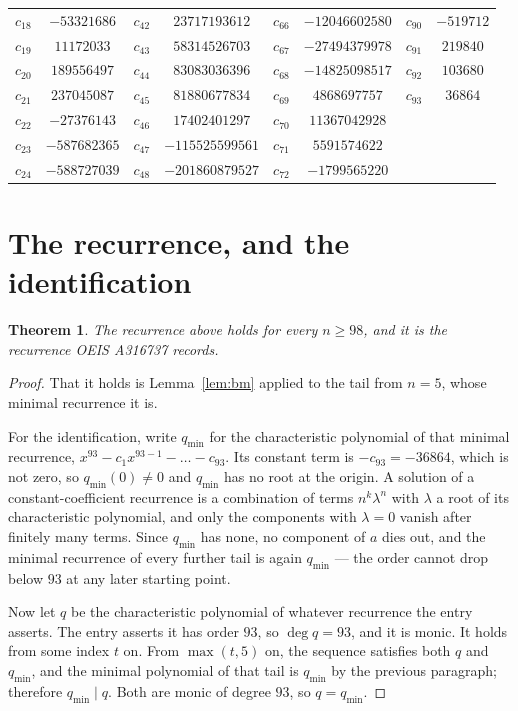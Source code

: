 \documentclass[11pt,a4paper]{article}
\theoremstyle{plain}
\newtheorem{theorem}{Theorem}
\theoremstyle{definition}
\begin{document}
\begin{center}
\begin{tabular}{cccccccc}
$c_{18}$ & $-53321686$ & $c_{42}$ & $23717193612$ & $c_{66}$ & $-12046602580$ & $c_{90}$ & $-519712$ \\
$c_{19}$ & $11172033$ & $c_{43}$ & $58314526703$ & $c_{67}$ & $-27494379978$ & $c_{91}$ & $219840$ \\
$c_{20}$ & $189556497$ & $c_{44}$ & $83083036396$ & $c_{68}$ & $-14825098517$ & $c_{92}$ & $103680$ \\
$c_{21}$ & $237045087$ & $c_{45}$ & $81880677834$ & $c_{69}$ & $4868697757$ & $c_{93}$ & $36864$ \\
$c_{22}$ & $-27376143$ & $c_{46}$ & $17402401297$ & $c_{70}$ & $11367042928$ &  &  \\
$c_{23}$ & $-587682365$ & $c_{47}$ & $-115525599561$ & $c_{71}$ & $5591574622$ &  &  \\
$c_{24}$ & $-588727039$ & $c_{48}$ & $-201860879527$ & $c_{72}$ & $-1799565220$ &  &  \\
\end{tabular}
\end{center}

\section{The recurrence, and the identification}

\begin{theorem}
The recurrence above holds for every $n\ge98$, and it is the recurrence OEIS A316737 records.
\end{theorem}

\begin{proof}
That it holds is Lemma~\ref{lem:bm} applied to the tail from $n=5$, whose minimal
recurrence it is.

For the identification, write $q_{\min}$ for the characteristic polynomial of that minimal
recurrence, $x^{93}-c_1x^{93-1}-\dots-c_{93}$. Its constant term is
$-c_{93}=-36864$, which is not zero, so $q_{\min}(0)\neq0$ and $q_{\min}$ has no
root at the origin. A solution of a constant-coefficient recurrence is a combination of terms
$n^{k}\lambda^{n}$ with $\lambda$ a root of its characteristic polynomial, and only the
components with $\lambda=0$ vanish after finitely many terms. Since $q_{\min}$ has none, no
component of $a$ dies out, and the minimal recurrence of every further tail is again
$q_{\min}$ --- the order cannot drop below $93$ at any later starting point.

Now let $q$ be the characteristic polynomial of whatever recurrence the entry asserts. The
entry asserts it has order $93$, so $\deg q=93$, and it is monic. It holds from some
index $t$ on. From $\max(t,5)$ on, the sequence satisfies both $q$ and $q_{\min}$, and
the minimal polynomial of that tail is $q_{\min}$ by the previous paragraph; therefore
$q_{\min}\mid q$. Both are monic of degree $93$, so $q=q_{\min}$.
\end{proof}
\end{document}
